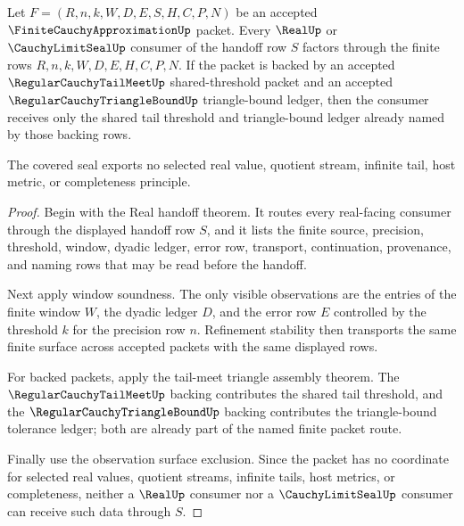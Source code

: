 \begin{theorem}
\label{thm:finite-cauchy-approximation-seal-coverage}
Let $F=(R,n,k,W,D,E,S,H,C,P,N)$ be an accepted $\FiniteCauchyApproximationUp$ packet. Every $\RealUp$ or $\CauchyLimitSealUp$ consumer of the handoff row $S$ factors through the finite rows $R,n,k,W,D,E,H,C,P,N$. If the packet is backed by an accepted $\RegularCauchyTailMeetUp$ shared-threshold packet and an accepted $\RegularCauchyTriangleBoundUp$ triangle-bound ledger, then the consumer receives only the shared tail threshold and triangle-bound ledger already named by those backing rows.

The covered seal exports no selected real value, quotient stream, infinite tail, host metric, or completeness principle.
\end{theorem}
\begin{proof}
Begin with the Real handoff theorem. It routes every real-facing consumer through the displayed handoff row $S$, and it lists the finite source, precision, threshold, window, dyadic ledger, error row, transport, continuation, provenance, and naming rows that may be read before the handoff.

Next apply window soundness. The only visible observations are the entries of the finite window $W$, the dyadic ledger $D$, and the error row $E$ controlled by the threshold $k$ for the precision row $n$. Refinement stability then transports the same finite surface across accepted packets with the same displayed rows.

For backed packets, apply the tail-meet triangle assembly theorem. The $\RegularCauchyTailMeetUp$ backing contributes the shared tail threshold, and the $\RegularCauchyTriangleBoundUp$ backing contributes the triangle-bound tolerance ledger; both are already part of the named finite packet route.

Finally use the observation surface exclusion. Since the packet has no coordinate for selected real values, quotient streams, infinite tails, host metrics, or completeness, neither a $\RealUp$ consumer nor a $\CauchyLimitSealUp$ consumer can receive such data through $S$.
\end{proof}

